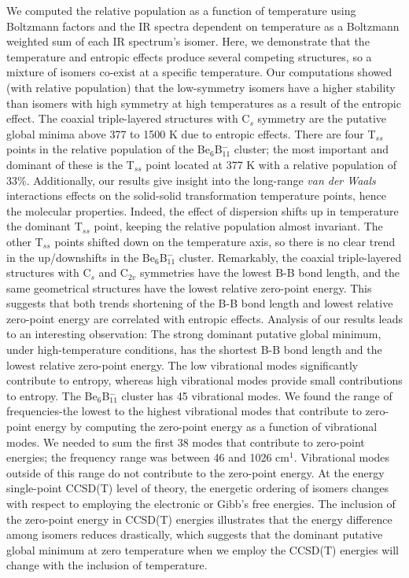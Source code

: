 \documentclass[prb,aps,preprint,showkeys,showpacs]{revtex4}
\begin{document}
We computed the relative population as a function of temperature using Boltzmann factors and the IR spectra dependent on temperature as a Boltzmann weighted sum of each IR spectrum’s isomer. Here, we demonstrate that the temperature and entropic effects produce several competing structures, so a mixture of isomers co-exist at a specific temperature. Our computations showed (with relative population) that the low-symmetry isomers have a higher stability than isomers with high symmetry at high temperatures as a result of the entropic effect. The coaxial triple-layered structures with C$_s$ symmetry are the putative global minima above 377 to 1500 K due to entropic effects. There are four T$_{ss}$ points in the relative population of the Be$_6$B$^{-}_{11}$ cluster; the most important and dominant of these is the T$_{ss}$ point located at 377 K with a relative population of 33{\%}. Additionally, our results give insight into the long-range \emph{van der Waals} interactions effects on the solid-solid transformation temperature points, hence the molecular properties. Indeed, the effect of dispersion shifts up in temperature the dominant T$_{ss}$ point, keeping the relative population almost invariant. The other T$_{ss}$ points shifted down on the temperature axis, so there is no clear trend in the up/downshifts in the  Be$_6$B$^{-}_{11}$ cluster. Remarkably, the coaxial triple-layered structures with C$_s$ and C$_{2v}$ symmetries have the lowest B-B bond length, and the same geometrical structures have the lowest relative zero-point energy. This suggests that both trends shortening of the B-B bond length and lowest relative zero-point energy are correlated with entropic effects. Analysis of our results leads to an interesting observation:  The strong dominant putative global minimum, under high-temperature conditions, has the shortest B-B bond length and the lowest relative zero-point energy. The low vibrational modes significantly contribute to entropy, whereas high vibrational modes provide small contributions to entropy. The Be$_6$B$^{-}_{11}$ cluster has 45 vibrational modes. We found the range of frequencies-the lowest to the highest vibrational modes that contribute to zero-point energy by computing the zero-point energy as a function of vibrational modes. We needed to sum the first 38 modes that contribute to zero-point energies; the frequency range was between 46 and 1026 cm$^1$. Vibrational modes outside of this range do not contribute to the zero-point energy. At the energy single-point CCSD(T) level of theory, the energetic ordering of isomers changes with respect to employing the electronic or Gibb’s free energies. The inclusion of the zero-point energy in CCSD(T) energies illustrates that the energy difference among isomers reduces drastically, which suggests that the dominant putative global minimum at zero temperature when we employ the CCSD(T) energies will change with the inclusion of temperature. 
\end{document}
